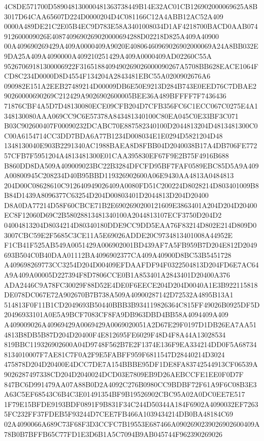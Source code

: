 \documentclass[UTF8,fontset=fandol,zihao=-4,a4paper]{ctexart}
\begin{document}
{{4C8DE571700D589048130000481363738449B14E32AC01CB126902000069625A8B3017D64CAA65607D224D0000204D4C081166C12A4ABB12AC52A409
0000A489DE21C2E05B4EC9D783E58A3401008034D1AF4218700BACD0AAB074912600009026E4087409690269020000694288D02218D825A409A40900
00A409690269429A409A0000409A9020E40806460969026902000069A24A8BB032E9DA25A409A4090000A409210251429A409A0000409AD02260C55A
95267069181300006922F3165188409490269026000090267A5708BB628EACE1064FCD8C234D0000D8D4554F134204A2843481EBC55A0200902676A6
090982E151A2EEB27489214D00009DB6E50E9213D284B743E0EED76C7DBAE290260000690269C212429A9026902600005BEE36A489BFFFF7F7436436
71876CBF4A5D7D48130080ECE09CFB204D7CFB356FC6C1ECC067C0275E4A1348130080AAA069CC9C6E57378A843481340100C80EA045C0E33BF3C071
B03C902600407F00090232DCABC70E887582340100D2044813204D4813481300C0C00A6154714CC3DD7BDA6A77B1234D008034E1E0294D5821204D48
1348130040E903B2291340AC1988BAEA8D8FBB04D2040038B17A4DB706FE77257CFB7F5951204A4813481300E01CAA395830EF67F9E2B75F4916B688
B860DD8DA509A409009023BC22B3284DFCFD95BF7FAF0589EBC85D5A9A409A00800945C208234D40B95BBD119326902600A06E9430AA4813A0484813
204D00C08628610C912640949026409A0080FD51C200224D8028214D803401009B8B84D1439A8096377C63254D204D00803401D2044813D204D20400
D8A0DA77214D58F60CBCE71B2E6902690200121609E3863401A204D204D20400EC8F12060D69C2B58028813481340100A2044813107ECF3750D204D2
04004813204D8034214D80340180DDE9CC9DD5EAA76F83214D802E214D809D03007CBC59E2F5685C3CE11A5E69026ADDE20C9734813401008A44952E
F1CB41F525AB549A0051429A006902001BD439AF7A5FB959B7D204E812D2049693B504C0B40DAA01112BA4096902377CA409A40900D8BC53B5451728
A409698269773CC3254D204D00409EFDAAFDF94F0322504813D204FD6E7AC64A9A409A00005D227394F8D7806CCE0B1A853401A2843401D20400A376
ADA2446C9A78FC30029F88D52E4DE0F6EECE204D204D0040A1E3B922115818DE078DC067E72A902670B7B738A509A40900287142D72532A4895B13A1
514813F0F11B1CD2049693B50440BBB3B934119826364C815FF49026B0925DF5D20496933101A0E5A9BCF7083CF8FA9DB963DBD4BB58A4094409A409
A409009026A40969429A0069429A0069020051A2D67E29F0197D1DB26EA7AA514813B8DB5B87D204D20400F4E812695FE6029F48D4F8A44A13028534
819BBC119326902600A04D9748F562B7E2F1374E136F9EA334214DD0F5A687348134010007F7AE81C7F0A2F9E5FABFF959F6811547D28440214D3024
475878D204D20400E4DCC7DE7A154BBBE95DF1DE8FA83742544913CF06539A9026287497338CD204D2040024DCD03E7809EB9D26AEBCCFE1EE0F0D7F
847BC6D991479AA07A88B0D2A4092C276B0980CC9BDBF72F61A9F6C08B3E3A63C5EF68543C6B4C3E01491354BF9B19526902CBC95A02A0DC0EE7E517
1F79E15BFDE9193BDF0891F9B831F34C244D50344A184F6902A4090032EF72635FC232FF37FDEB5F93244D7CEE7FB466A1039434214DB0BA48184C69
02A4090066A689C73F68F3D3CCFC7B19553E687466A0902690239026902600409A78B0B7BFFB65C77FD1E3D6B1A5C7094B9AB045744F962390269026
}}
\end{document}
